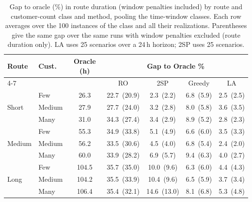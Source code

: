 \begin{table}[htbp]
\centering
\caption{Gap to oracle (\%) in route duration (window penalties included) by route and customer-count class and method, pooling the time-window classes.  Each row averages over the 100 instances of the class and all their realizations.  Parentheses give the same gap over the same runs with window penalties excluded (route duration only).  LA uses 25 scenarios over a 24\,h horizon; 2SP uses 25 scenarios.}
\label{tab:gap-simplified}
\begin{tabular}{ll c cccc}
\toprule
\multirow{2}{*}{\textbf{\small Route}} & \multirow{2}{*}{\textbf{\small Cust.}} & \multirow{2}{*}{\textbf{Oracle (h)}} &
\multicolumn{4}{c}{\textbf{Gap to Oracle \%}} \\
\cmidrule(lr){4-7}
 & & & RO & 2SP & Greedy & LA \\
\midrule
\multirow{3}{*}{\small Short} & {\small Few} & 26.3 & 22.7~{\scriptsize(20.9)} & 2.3~{\scriptsize(2.2)} & 6.8~{\scriptsize(5.9)} & 2.5~{\scriptsize(2.5)} \\
 & {\small Medium} & 27.9 & 27.7~{\scriptsize(24.0)} & 3.2~{\scriptsize(2.8)} & 8.0~{\scriptsize(5.8)} & 3.6~{\scriptsize(3.5)} \\
 & {\small Many} & 31.0 & 34.3~{\scriptsize(27.4)} & 3.4~{\scriptsize(2.9)} & 8.9~{\scriptsize(5.2)} & 2.8~{\scriptsize(2.3)} \\
\midrule
\multirow{3}{*}{\small Medium} & {\small Few} & 55.3 & 34.9~{\scriptsize(33.8)} & 5.1~{\scriptsize(4.9)} & 6.6~{\scriptsize(6.0)} & 3.5~{\scriptsize(3.3)} \\
 & {\small Medium} & 56.2 & 33.5~{\scriptsize(30.6)} & 4.5~{\scriptsize(4.0)} & 6.8~{\scriptsize(5.4)} & 2.4~{\scriptsize(2.0)} \\
 & {\small Many} & 60.0 & 33.9~{\scriptsize(28.2)} & 6.9~{\scriptsize(5.7)} & 9.4~{\scriptsize(6.3)} & 4.0~{\scriptsize(2.7)} \\
\midrule
\multirow{3}{*}{\small Long} & {\small Few} & 104.5 & 35.7~{\scriptsize(35.0)} & 10.0~{\scriptsize(9.6)} & 6.3~{\scriptsize(6.0)} & 4.4~{\scriptsize(4.3)} \\
 & {\small Medium} & 104.2 & 35.5~{\scriptsize(33.9)} & 10.4~{\scriptsize(9.6)} & 6.5~{\scriptsize(5.9)} & 3.7~{\scriptsize(3.4)} \\
 & {\small Many} & 106.4 & 35.4~{\scriptsize(32.1)} & 14.6~{\scriptsize(13.0)} & 8.1~{\scriptsize(6.8)} & 5.3~{\scriptsize(4.8)} \\
\bottomrule
\end{tabular}
\end{table}
